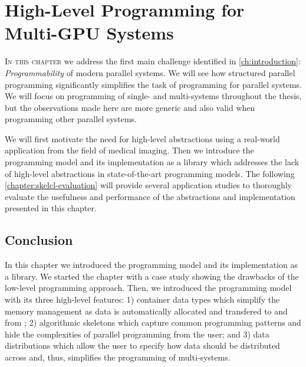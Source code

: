 
\chapter{High-Level Programming for Multi-GPU Systems}
%
%

\label{chapter:skelcl}

\lettrine[lines=3, loversize=0.1]{I}{n this chapter} we address the first main challenge identified in \autoref{ch:introduction}: \emph{Programmability} of modern parallel systems.
We will see how structured parallel programming significantly simplifies the task of programming for parallel systems.
We will focus on programming of single- and multi-\GPU systems throughout the thesis, but the observations made here are more generic and also valid when programming other parallel systems.

We will first motivate the need for high-level abstractions using a real-world \OpenCL application from the field of medical imaging.
Then we introduce the \emph{\SkelCL} programming model and its implementation as a \Cpp library which addresses the lack of high-level abstractions in state-of-the-art \GPU programming models.
The following \autoref{chapter:skelcl-evaluation} will provide several application studies to thoroughly evaluate the usefulness and performance of the abstractions and implementation presented in this chapter.









\section{Conclusion}
In this chapter we introduced the \SkelCL programming model and its implementation as a \Cpp library.
We started the chapter with a case study showing the drawbacks of the low-level \OpenCL programming approach.
Then, we introduced the \SkelCL programming model with its three high-level features:
1) container data types which simplify the memory management as data is automatically allocated and transfered to and from \GPUs;
2) algorithmic skeletons which capture common programming patterns and hide the complexities of parallel programming from the user; and
3) data distributions which allow the user to specify how data should be distributed across \GPUs and, thus, simplifies the programming of multi-\GPU systems.

